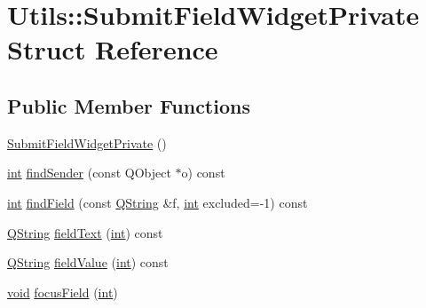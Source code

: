 \hypertarget{struct_utils_1_1_submit_field_widget_private}{\section{Utils\-:\-:Submit\-Field\-Widget\-Private Struct Reference}
\label{struct_utils_1_1_submit_field_widget_private}
}
\subsection*{Public Member Functions}
\begin{DoxyCompactItemize}
\item 
\hyperlink{struct_utils_1_1_submit_field_widget_private_a27be810d043cf134ce593b9055962877}{Submit\-Field\-Widget\-Private} ()
\item 
\hyperlink{ioapi_8h_a787fa3cf048117ba7123753c1e74fcd6}{int} \hyperlink{struct_utils_1_1_submit_field_widget_private_a7b35cb7631b89495bc76221ecc9f2796}{find\-Sender} (const Q\-Object $\ast$o) const 
\item 
\hyperlink{ioapi_8h_a787fa3cf048117ba7123753c1e74fcd6}{int} \hyperlink{struct_utils_1_1_submit_field_widget_private_a3f508eb85447b5ccbcc52b5dcce0ce4a}{find\-Field} (const \hyperlink{group___u_a_v_objects_plugin_gab9d252f49c333c94a72f97ce3105a32d}{Q\-String} \&f, \hyperlink{ioapi_8h_a787fa3cf048117ba7123753c1e74fcd6}{int} excluded=-\/1) const 
\item 
\hyperlink{group___u_a_v_objects_plugin_gab9d252f49c333c94a72f97ce3105a32d}{Q\-String} \hyperlink{struct_utils_1_1_submit_field_widget_private_a4dfbd3d5b1ce0fffbc4327078775eec2}{field\-Text} (\hyperlink{ioapi_8h_a787fa3cf048117ba7123753c1e74fcd6}{int}) const 
\item 
\hyperlink{group___u_a_v_objects_plugin_gab9d252f49c333c94a72f97ce3105a32d}{Q\-String} \hyperlink{struct_utils_1_1_submit_field_widget_private_adf117621941ece3a6b17bc506dc8d4c7}{field\-Value} (\hyperlink{ioapi_8h_a787fa3cf048117ba7123753c1e74fcd6}{int}) const 
\item 
\hyperlink{group___u_a_v_objects_plugin_ga444cf2ff3f0ecbe028adce838d373f5c}{void} \hyperlink{struct_utils_1_1_submit_field_widget_private_a06a07720110e7672707b04d2a459b670}{focus\-Field} (\hyperlink{ioapi_8h_a787fa3cf048117ba7123753c1e74fcd6}{int})
\end{DoxyCompactItemize}
